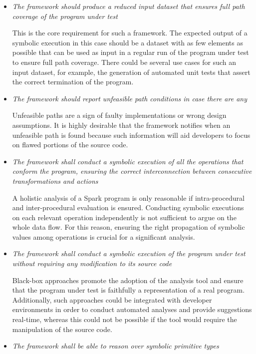 \newcommand{\reqitem}[1]{\item[\textit{\textbf{R.#1}}]}
\begin{itemize}
\reqitem{1} \textit{The framework should produce a reduced input dataset that ensures full path coverage of the program under test}

This is the core requirement for such a framework. The expected output of a symbolic execution in this case should be a dataset with as few elements as possible that can be used as input in a regular run of the program under test to ensure full path coverage. There could be several use cases for such an input dataset, for example, the generation of automated unit tests that assert the correct termination of the program.

\reqitem{2} \textit{The framework should report unfeasible path conditions in case there are any}

Unfeasible paths are a sign of faulty implementations or wrong design assumptions. It is highly desirable that the framework notifies when an unfeasible path is found because such information will aid developers to focus on flawed portions of the source code.

\reqitem{3} \textit{The framework shall conduct a symbolic execution of all the operations that conform the program, ensuring the correct interconnection between consecutive transformations and actions}

A holistic analysis of a Spark program is only reasonable if intra-procedural and inter-procedural evaluation is ensured. Conducting symbolic executions on each relevant operation independently is not sufficient to argue on the whole data flow. For this reason, ensuring the right propagation of symbolic values among operations is crucial for a significant analysis.
	
\reqitem{4} \textit{The framework shall conduct a symbolic execution of the program under test without requiring any modification to its source code}

Black-box approaches promote the adoption of the analysis tool and ensure that the program under test is faithfully a representation of a real program. Additionally, such approaches could be integrated with developer environments in order to conduct automated analyses and provide suggestions real-time, whereas this could not be possible if the tool would require the manipulation of the source code. 
	
\reqitem{5} \textit{The framework shall be able to reason over symbolic primitive types}


\end{itemize}
